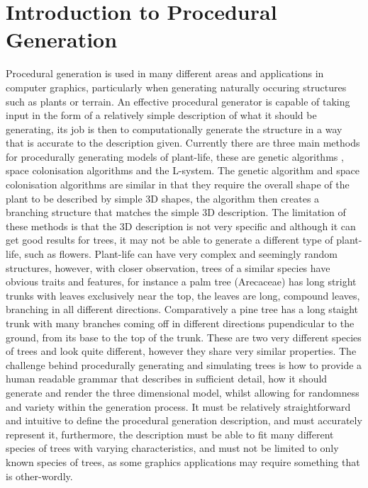 \section{Introduction to Procedural Generation}

Procedural generation is used in many different areas and applications in computer graphics, particularly when generating naturally occuring structures such as plants or terrain. An effective procedural generator is capable of taking input in the form of a relatively simple description of what it should be generating, its job is then to computationally generate the structure in a way that is accurate to the description given. Currently there are three main methods for procedurally generating models of plant-life, these are genetic algorithms \cite{haubenwallner2017shapegenetics}, space colonisation algorithms\cite{juuso2017procedural} and the L-system. The genetic algorithm and space colonisation algorithms are similar in that they require the overall shape of the plant to be described by simple 3D shapes, the algorithm then creates a branching structure that matches the simple 3D description. The limitation of these methods is that the 3D description is not very specific and although it can get good results for trees, it may not be able to generate a different type of plant-life, such as flowers. Plant-life can have very complex and seemingly random structures, however, with closer observation, trees of a similar species have obvious traits and features, for instance a palm tree (Arecaceae) has long stright trunks with leaves exclusively near the top, the leaves are long, compound leaves, branching in all different directions. Comparatively a pine tree has a long staight trunk with many branches coming off in different directions pupendicular to the ground, from its base to the top of the trunk. These are two very different species of trees and look quite different, however they share very similar properties. The challenge behind procedurally generating and simulating trees is how to provide a human readable grammar that describes in sufficient detail, how it should generate and render the three dimensional model, whilst allowing for randomness and variety within the generation process. It must be relatively straightforward and intuitive to define the procedural generation description, and must accurately represent it, furthermore, the description must be able to fit many different species of trees with varying characteristics, and must not be limited to only known species of trees, as some graphics applications may require something that is other-wordly.

